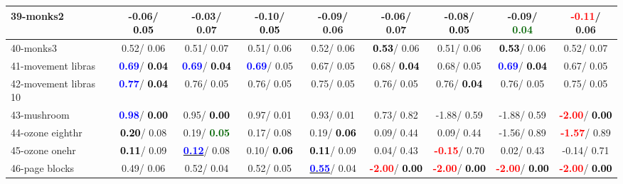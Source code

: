 \begin{table}[h]
\begin{center}
\begin{tabular}{lc|c|c|c|c|c|c|c}
39-monks2 &  -0.06/\textcolor{black}{\textbf{  0.05}} &  -0.03/  0.07 &  -0.10/\textcolor{black}{\textbf{  0.05}} &  -0.09/  0.06 &  -0.06/  0.07 &  -0.08/\textcolor{black}{\textbf{  0.05}} &  -0.09/\textcolor{darkgreen}{\textbf{  0.04}} & \textcolor{red}{\textbf{ -0.11}}/  0.06 \\ \hline
40-monks3 &   0.52/  0.06 &   0.51/  0.07 &   0.51/  0.06 &   0.52/  0.06 & \textcolor{black}{\textbf{  0.53}}/  0.06 &   0.51/  0.06 & \textcolor{black}{\textbf{  0.53}}/  0.06 &   0.52/  0.07 \\
41-movement libras & \textcolor{blue}{\textbf{  0.69}}/\textcolor{black}{\textbf{  0.04}} & \textcolor{blue}{\textbf{  0.69}}/\textcolor{black}{\textbf{  0.04}} & \textcolor{blue}{\textbf{  0.69}}/  0.05 &   0.67/  0.05 &   0.68/\textcolor{black}{\textbf{  0.04}} &   0.68/  0.05 & \textcolor{blue}{\textbf{  0.69}}/\textcolor{black}{\textbf{  0.04}} &   0.67/  0.05 \\
42-movement libras 10 & \textcolor{blue}{\textbf{  0.77}}/\textcolor{black}{\textbf{  0.04}} &   0.76/  0.05 &   0.76/  0.05 &   0.75/  0.05 &   0.76/  0.05 &   0.76/\textcolor{black}{\textbf{  0.04}} &   0.76/  0.05 &   0.75/  0.05 \\
43-mushroom & \textcolor{blue}{\textbf{  0.98}}/\textcolor{black}{\textbf{  0.00}} &   0.95/\textcolor{black}{\textbf{  0.00}} &   0.97/  0.01 &   0.93/  0.01 &   0.73/  0.82 &  -1.88/  0.59 &  -1.88/  0.59 & \textcolor{red}{\textbf{ -2.00}}/\textcolor{black}{\textbf{  0.00}} \\
44-ozone eighthr & \textcolor{black}{\textbf{  0.20}}/  0.08 &   0.19/\textcolor{darkgreen}{\textbf{  0.05}} &   0.17/  0.08 &   0.19/\textcolor{black}{\textbf{  0.06}} &   0.09/  0.44 &   0.09/  0.44 &  -1.56/  0.89 & \textcolor{red}{\textbf{ -1.57}}/  0.89 \\
45-ozone onehr & \textcolor{black}{\textbf{  0.11}}/  0.09 & \underline{\textcolor{blue}{\textbf{  0.12}}}/  0.08 &   0.10/\textcolor{black}{\textbf{  0.06}} & \textcolor{black}{\textbf{  0.11}}/  0.09 &   0.04/  0.43 & \textcolor{red}{\textbf{ -0.15}}/  0.70 &   0.02/  0.43 &  -0.14/  0.71 \\
46-page blocks &   0.49/  0.06 &   0.52/  0.04 &   0.52/  0.05 & \underline{\textcolor{blue}{\textbf{  0.55}}}/  0.04 & \textcolor{red}{\textbf{ -2.00}}/\textcolor{black}{\textbf{  0.00}} & \textcolor{red}{\textbf{ -2.00}}/\textcolor{black}{\textbf{  0.00}} & \textcolor{red}{\textbf{ -2.00}}/\textcolor{black}{\textbf{  0.00}} & \textcolor{red}{\textbf{ -2.00}}/\textcolor{black}{\textbf{  0.00}} \\ \hline

\end{tabular}
\end{center}
\end{table}
